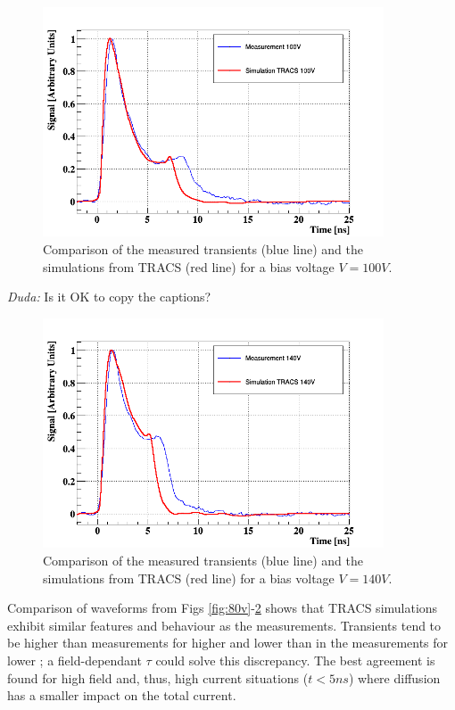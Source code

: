 \begin{figure}[H]
	\centering
	\includegraphics[width=0.9\textwidth]{100V.png}
	\caption{Comparison of the measured transients (blue line) and the simulations from TRACS (red line) for a bias voltage $V = 100V$.}
	\label{fig:100v}
\end{figure}

\emph{Duda: } Is it OK to copy the captions?

\begin{figure}[H]
	\centering
	\includegraphics[width=0.9\textwidth]{140V.png}
	\caption{Comparison of the measured transients (blue line) and the simulations from TRACS (red line) for a bias voltage $V = 140V$.}
	\label{fig:140v}
\end{figure}

Comparison of waveforms from Figs \ref{fig:80v}-\ref{fig:140v} shows that TRACS simulations exhibit similar features and behaviour as the measurements. Transients tend to be higher than measurements for higher \vias and lower than in the measurements for lower \vias; a field-dependant $\tau$ could solve this discrepancy. The best agreement is found for high field and, thus, high current situations ($t < 5ns$) where diffusion has a smaller impact on the total current.

